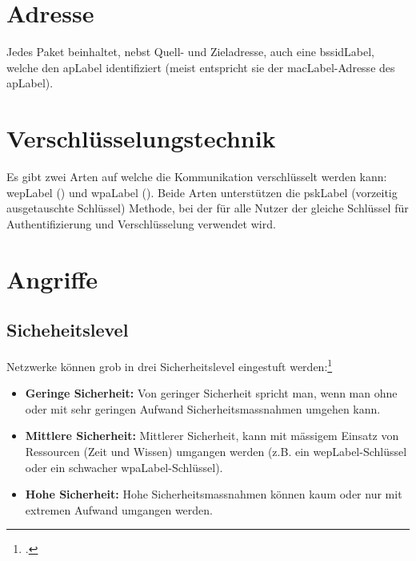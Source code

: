 \section{Adresse}
Jedes Paket beinhaltet, nebst Quell- und Zieladresse, auch eine \gls{bssidLabel}, welche den \gls{apLabel} identifiziert (meist entspricht sie der \gls{macLabel}-Adresse des \gls{apLabel}).


\section{Verschlüsselungstechnik}
Es gibt zwei Arten auf welche die Kommunikation verschlüsselt werden kann: \gls{wepLabel} () und \gls{wpaLabel} ().
Beide Arten unterstützen die \gls{pskLabel} (vorzeitig ausgetauschte Schlüssel) Methode, bei der für alle Nutzer der gleiche Schlüssel für Authentifizierung und Verschlüsselung verwendet wird.

\section{Angriffe}

\subsection{Sicheheitslevel}
Netzwerke können grob in drei Sicherheitslevel eingestuft werden:\footcite[][115]{WrightCache201503}
\begin{itemize}
	\item \textbf{Geringe Sicherheit:} Von geringer Sicherheit spricht man, wenn man ohne oder mit sehr geringen Aufwand Sicherheitsmassnahmen umgehen kann.
	\item \textbf{Mittlere Sicherheit:} Mittlerer Sicherheit, kann mit mässigem Einsatz von Ressourcen (Zeit und Wissen) umgangen werden (z.B. ein \gls{wepLabel}-Schlüssel oder ein schwacher \gls{wpaLabel}-Schlüssel).
	\item \textbf{Hohe Sicherheit:} Hohe Sicherheitsmassnahmen können kaum oder nur mit extremen Aufwand umgangen werden.
\end{itemize}

